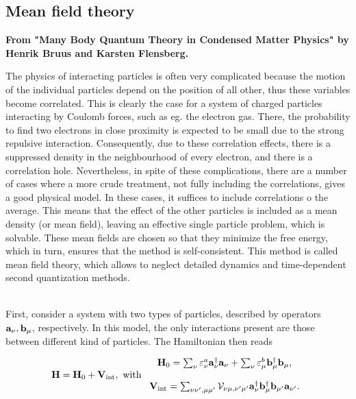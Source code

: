 \subsection{Mean field theory}

\textbf{From "Many Body Quantum Theory in Condensed Matter Physics" by Henrik Bruus and Karsten Flensberg.}

\begin{tcolorbox}[colback = yellow, title = Physical Context]

The physics of interacting particles is often very complicated because the motion of the individual particles depend on the position of all other, thus these variables become correlated. This is clearly the case for a system of charged particles interacting by Coulomb forces, such as eg. the electron gas. There, the probability to find two electrons in close proximity is expected to be small due to the strong repulsive interaction. Consequently, due to these correlation effects, there is a suppressed density in the neighbourhood of every electron, and there is a correlation hole. 
Nevertheless, in spite of these complications, there are a number of cases where a more crude treatment, not fully including the correlations, gives a good physical model. In these cases, it suffices to include correlations o the average. This means that the effect of the other particles is included as a mean density (or mean field), leaving an effective single particle problem, which is solvable. These mean fields are chosen so that they minimize the free energy, which in turn, ensures that the method is self-consistent. This method is called mean field theory, which allows to neglect detailed dynamics and time-dependent second quantization methods. 

\end{tcolorbox}

\blanky \\

First, consider a system with two types of particles, described by operators ${\bf a}_\nu, {\bf b}_{\mu}$, respectively. In this model, the only interactions present are those between different kind of particles. The Hamiltonian then reads

\begin{equation}
    {\bf H} = {\bf H}_0 + {\bf V}_{\textnormal{int}}, \textnormal{ with } \begin{array}{c}
         {\bf H}_0 = \sum_{\nu} \varepsilon_{\nu}^a {\bf a}_\nu^\dagger {\bf a}_\nu + \sum_{\nu} \varepsilon_{\mu}^b{\bf b}_\mu^\dagger {\bf b}_\mu,  \\
         \\
         {\bf V}_{\textnormal{int}}  = \sum_{\nu\nu', \mu\mu'} {\mathcal V}_{\nu\mu, \nu'\mu'} {\bf a}^\dagger_{\nu} {\bf b}_{\mu}^\dagger {\bf b}_{\mu'} {\bf a}_{\nu'}.
    \end{array}
\end{equation}

